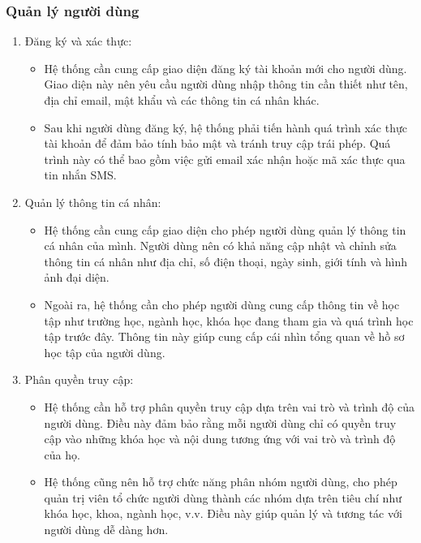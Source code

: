 \documentclass[../Thesis.tex]{subfiles}
\begin{document}
        \subsubsection{Quản lý người dùng}
            \begin{enumerate}
                \item Đăng ký và xác thực:
                    \begin{itemize}[label=$\bullet$]
                        \item Hệ thống cần cung cấp giao diện đăng ký tài khoản mới cho người dùng. Giao diện này nên yêu cầu người dùng nhập thông tin cần thiết như tên, địa chỉ email, mật khẩu và các thông tin cá nhân khác.
                        \item Sau khi người dùng đăng ký, hệ thống phải tiến hành quá trình xác thực tài khoản để đảm bảo tính bảo mật và tránh truy cập trái phép. Quá trình này có thể bao gồm việc gửi email xác nhận hoặc mã xác thực qua tin nhắn SMS.
                    \end{itemize}

                \item Quản lý thông tin cá nhân:
                    \begin{itemize}[label=$\bullet$]
                        \item Hệ thống cần cung cấp giao diện cho phép người dùng quản lý thông tin cá nhân của mình. Người dùng nên có khả năng cập nhật và chỉnh sửa thông tin cá nhân như địa chỉ, số điện thoại, ngày sinh, giới tính và hình ảnh đại diện.
                        \item Ngoài ra, hệ thống cần cho phép người dùng cung cấp thông tin về học tập như trường học, ngành học, khóa học đang tham gia và quá trình học tập trước đây. Thông tin này giúp cung cấp cái nhìn tổng quan về hồ sơ học tập của người dùng.
                    \end{itemize}

                \item Phân quyền truy cập:
                    \begin{itemize}[label=$\bullet$]
                        \item Hệ thống cần hỗ trợ phân quyền truy cập dựa trên vai trò và trình độ của người dùng. Điều này đảm bảo rằng mỗi người dùng chỉ có quyền truy cập vào những khóa học và nội dung tương ứng với vai trò và trình độ của họ.

                        \item Hệ thống cũng nên hỗ trợ chức năng phân nhóm người dùng, cho phép quản trị viên tổ chức người dùng thành các nhóm dựa trên tiêu chí như khóa học, khoa, ngành học, v.v. Điều này giúp quản lý và tương tác với người dùng dễ dàng hơn.
                    \end{itemize}


\end{enumerate}
\end{document}
